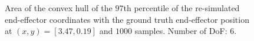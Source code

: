 \documentclass[conference]{IEEEtran}
\begin{document}
\begin{figure}[tbh]
\centering

    \caption{Area of the convex hull of the \(97\)th percentile of the re-simulated end-effector coordinates with the ground truth end-effector position at $(x, y) = [3.47, 0.19]$ and $1000$ samples. Number of DoF: 6.}
\end{figure}
\end{document}
